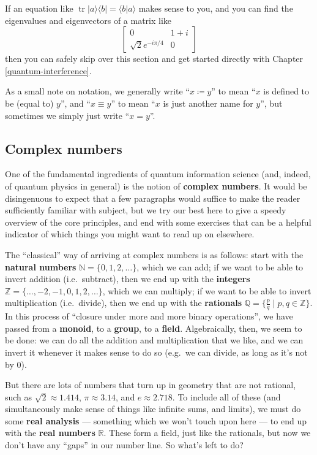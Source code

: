 \documentclass[fleqn,a4paper]{article}
\theoremstyle{definition}
\theoremstyle{definition}
\theoremstyle{definition}
\theoremstyle{definition}
\theoremstyle{remark}
\begin{document}
If an equation like \(\operatorname{tr}|a\rangle\langle b|=\langle b|a\rangle\) makes sense to you, and you can find the eigenvalues and eigenvectors of a matrix like
\[
  \begin{bmatrix}
    0 & 1+i
  \\\sqrt{2}e^{-i\pi/4} & 0
  \end{bmatrix}
\]
then you can safely skip over this section and get started directly with Chapter \ref{quantum-interference}.

As a small note on notation, we generally write ``\(x\coloneqq y\)'' to mean ``\(x\) is defined to be (equal to) \(y\)'', and ``\(x\equiv y\)'' to mean ``\(x\) is just another name for \(y\)'', but sometimes we simply just write ``\(x=y\)''.

\hypertarget{complex-numbers}{%
\subsection{Complex numbers}\label{complex-numbers}}

One of the fundamental ingredients of quantum information science (and, indeed, of quantum physics in general) is the notion of \textbf{complex numbers}.
It would be disingenuous to expect that a few paragraphs would suffice to make the reader sufficiently familiar with subject, but we try our best here to give a speedy overview of the core principles, and end with some exercises that can be a helpful indicator of which things you might want to read up on elsewhere.

The ``classical'' way of arriving at complex numbers is as follows: start with the \textbf{natural numbers} \(\mathbb{N}=\{0,1,2,\ldots\}\), which we can add; if we want to be able to invert addition (i.e.~subtract), then we end up with the \textbf{integers} \(\mathbb{Z}=\{\ldots,-2,-1,0,1,2,\ldots\}\), which we can multiply; if we want to be able to invert multiplication (i.e.~divide), then we end up with the \textbf{rationals} \(\mathbb{Q}=\{\frac{p}{q}\mid p,q\in\mathbb{Z}\}\).
In this process of ``closure under more and more binary operations'', we have passed from a \textbf{monoid}, to a \textbf{group}, to a \textbf{field}.
Algebraically, then, we seem to be done: we can do all the addition and multiplication that we like, and we can invert it whenever it makes sense to do so (e.g.~we can divide, as long as it's not by \(0\)).

But there are lots of numbers that turn up in geometry that are not rational, such as \(\sqrt{2}\approx1.414\), \(\pi\approx3.14\), and \(e\approx2.718\).
To include all of these (and simultaneously make sense of things like infinite sums, and limits), we must do some \textbf{real analysis} --- something which we won't touch upon here --- to end up with the \textbf{real numbers} \(\mathbb{R}\).
These form a field, just like the rationals, but now we don't have any ``gaps'' in our number line.
So what's left to do?
\end{document}

